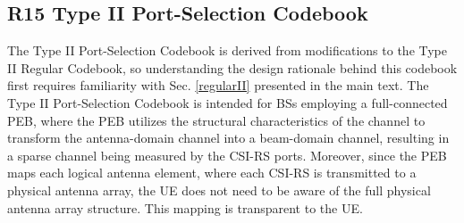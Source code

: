 \documentclass[lettersize,journal]{IEEEtran}
\begin{document}
\begin{appendices}
\subsection{R15 Type II Port-Selection Codebook} \label{r15ps}
The Type II Port-Selection Codebook is derived from modifications to the Type II Regular Codebook, so understanding the design rationale behind this codebook first requires familiarity with Sec. \ref{regularII} presented in the main text. The Type II Port-Selection Codebook is intended for BSs employing a full-connected PEB, where the PEB utilizes the structural characteristics of the channel to transform the antenna-domain channel into a beam-domain channel, resulting in a sparse channel being measured by the CSI-RS ports. Moreover, since the PEB maps each logical antenna element, where each CSI-RS is transmitted to a physical antenna array, the UE does not need to be aware of the full physical antenna array structure. This mapping is transparent to the UE.




\end{appendices}
\end{document}
